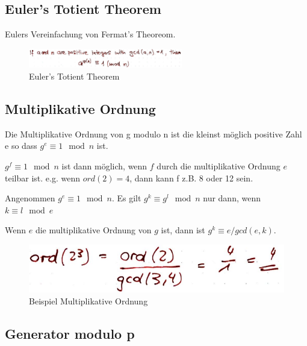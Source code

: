 \hypertarget{eulers-totient-theorem}{%
\subsection{Euler's Totient Theorem}\label{eulers-totient-theorem}}

Eulers Vereinfachung von Fermat's Theoreom.

\begin{figure}[H]
\centering
\includegraphics[width=0.6\textwidth]{figures/eulersTotientTheorem.png}
\caption{Euler's Totient Theorem}
\end{figure}

\hypertarget{multiplikative-ordnung}{%
\subsection{Multiplikative Ordnung}\label{multiplikative-ordnung}}

Die Multiplikative Ordnung von g modulo n ist die kleinst möglich
positive Zahl e so dass $g^e \equiv 1 \mod n$ ist.

\begin{tcolorbox}[colback=red!5!white,colframe=red!75!black]
$g^f \equiv 1 \mod n$ ist dann möglich, wenn $f$ durch die multiplikative Ordnung $e$ teilbar ist. 
e.g. wenn $ord(2) = 4$, dann kann f z.B. 8 oder 12 sein.

Angenommen $g^e \equiv 1 \mod n$. Es gilt $g^k \equiv g^l \mod n$ nur dann, wenn $k \equiv l \mod e$

Wenn $e$ die multiplikative Ordnung von $g$ ist, dann ist $g^k \equiv e / gcd(e, k)$.
\end{tcolorbox}

\begin{figure}[H]
\centering
\includegraphics[width=1\textwidth]{figures/multiplicativeOrderExample.png}
\caption{Beispiel Multiplikative Ordnung}
\end{figure}

\hypertarget{generator-modulo-p}{%
\subsection{Generator modulo p}\label{generator-modulo-p}}

